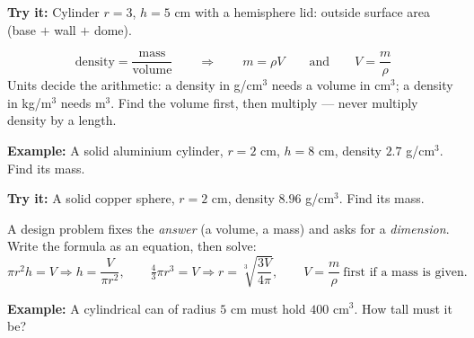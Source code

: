 \documentclass[12pt]{article}
\begin{document}
\begin{tryitbox}
\textbf{Try it:} \quad Cylinder $r = 3$, $h = 5$ cm with a hemisphere lid: outside surface
area (base $+$ wall $+$ dome).\\[2pt]
\end{tryitbox}


\begin{formulabox}
\[ \text{density} = \frac{\text{mass}}{\text{volume}} \qquad\Longrightarrow\qquad
   m = \rho V \qquad\text{and}\qquad V = \frac{m}{\rho} \]
Units decide the arithmetic: a density in g/cm$^3$ needs a volume in cm$^3$; a density in
kg/m$^3$ needs m$^3$. Find the volume first, then multiply --- never multiply density by a
length.
\end{formulabox}

\begin{examplebox}
\textbf{Example:} \quad A solid aluminium cylinder, $r = 2$ cm, $h = 8$ cm, density
$2.7$ g/cm$^3$. Find its mass.
\end{examplebox}

\begin{tryitbox}
\textbf{Try it:} \quad A solid copper sphere, $r = 2$ cm, density $8.96$ g/cm$^3$. Find its
mass.\\[2pt]
\end{tryitbox}


\begin{formulabox}
A design problem fixes the \emph{answer} (a volume, a mass) and asks for a \emph{dimension}.
Write the formula as an equation, then solve:
\[ \pi r^2 h = V \Rightarrow h = \frac{V}{\pi r^2}, \qquad
   \tfrac{4}{3}\pi r^3 = V \Rightarrow r = \sqrt[3]{\frac{3V}{4\pi}}, \qquad
   V = \frac{m}{\rho}\ \text{first if a mass is given.} \]
\end{formulabox}

\begin{examplebox}
\textbf{Example:} \quad A cylindrical can of radius $5$ cm must hold $400$ cm$^3$. How tall
must it be?
\end{examplebox}
\end{document}
